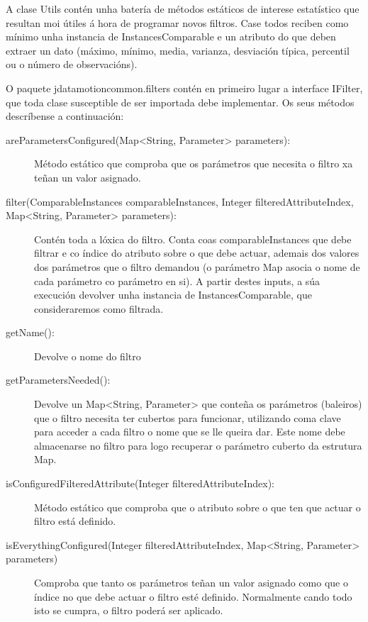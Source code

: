 A clase Utils contén unha batería de métodos estáticos de interese estatístico que resultan moi útiles á hora de programar novos filtros. Case todos reciben como mínimo unha instancia de InstancesComparable e un atributo do que deben extraer un dato (máximo, mínimo, media, varianza, desviación típica, percentil ou o número de observacións).

O paquete jdatamotioncommon.filters contén en primeiro lugar a interface IFilter, que toda clase susceptible de ser importada debe implementar. Os seus métodos descríbense a continuación:

\begin{description}
\item[areParametersConfigured(Map\textless String, Parameter\textgreater{} parameters):] \hfill
Método estático que comproba que os parámetros que necesita o filtro xa teñan un valor asignado.
\item[filter(ComparableInstances comparableInstances, Integer filteredAttributeIndex, Map\textless String, Parameter\textgreater{} parameters):] \hfill
Contén toda a lóxica do filtro. Conta coas comparableInstances que debe filtrar e co índice do atributo sobre o que debe actuar, ademais dos valores dos parámetros que o filtro demandou (o parámetro Map asocia o nome de cada parámetro co parámetro en si). A partir destes inputs, a súa execución devolver unha instancia de InstancesComparable, que consideraremos como filtrada.
\item[getName():] \hfill
Devolve o nome do filtro
\item[getParametersNeeded():] \hfill
Devolve un Map\textless String, Parameter\textgreater{} que conteña os parámetros (baleiros) que o filtro necesita ter cubertos para funcionar, utilizando coma clave para acceder a cada filtro o nome que se lle queira dar. Este nome debe almacenarse no filtro para logo recuperar o parámetro cuberto da estrutura Map.
\item[isConfiguredFilteredAttribute(Integer filteredAttributeIndex):] \hfill
Método estático que comproba que o atributo sobre o que ten que actuar o filtro está definido.
\item[isEverythingConfigured(Integer filteredAttributeIndex, Map\textless String, Parameter\textgreater{} parameters)] \hfill
Comproba que tanto os parámetros teñan un valor asignado como que o índice no que debe actuar o filtro esté definido. Normalmente cando todo isto se cumpra, o filtro poderá ser aplicado.
\end{description}


